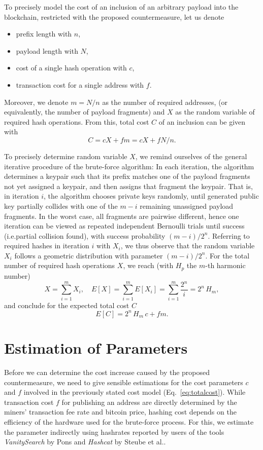 \documentclass[a4paper,11pt,titlepage]{scrbook}
\begin{document}
To precisely model the cost of an inclusion of an arbitrary payload into the blockchain, restricted with the proposed countermeasure, let us denote
\begin{itemize}[noitemsep]
    \item prefix length with $n$,
    \item payload length with $N$,
    \item cost of a single hash operation with $c$,
    \item transaction cost for a single address with $f$.
\end{itemize}
Moreover, we denote $m=N/n$ as the number of required addresses, (or equivalently, the number of payload fragments) and $X$ as the random variable of required hash operations.
From this, total cost $C$ of an inclusion can be given with
\[ C =  c X + fm = c X + fN/n . \]

To precisely determine random variable $X$, we remind ourselves of the general iterative procedure of the brute-force algorithm:
In each iteration, the algorithm determines a keypair such that its prefix matches one of the payload fragments not yet assigned a keypair, and then assigns that fragment the keypair.
That is, in iteration $i$, the algorithm chooses private keys randomly, until generated public key partially collides with one of the $m-i$ remaining unassigned payload fragments.
In the worst case, all fragments are pairwise different, hence one iteration can be viewed as repeated independent Bernoulli trials until success (i.e.\@ partial collision found), with success probability $(m-i)/2^n$.
Referring to required hashes in iteration $i$ with $X_i$, we thus observe that the random variable $X_i$ follows a geometric distribution with parameter $(m-i)/2^n$.
For the total number of required hash operations $X$, we reach (with $H_p$ the $m$-th harmonic number)
\[ X = \sum_{i=1}^{m} X_i, \quad E[X] = \sum_{i=1}^{m} E[X_i] = \sum_{i=1}^{m}\frac{2^n}{i} = 2^n\, H_m, \]
and conclude for the expected total cost $C$
\begin{equation}
    E[C] = 2^n\, H_m\,c + fm.\label{eq:totalcost}
\end{equation}

\section{Estimation of Parameters}\label{sec:parameters}

Before we can determine the cost increase caused by the proposed countermeasure, we need to give sensible estimations for the cost parameters $c$ and $f$ involved in the previously stated cost model (Eq.~\ref{eq:totalcost}).
While transaction cost $f$ for publishing an address are directly determined by the miners' transaction fee rate and bitcoin price, hashing cost depends on the efficiency of the hardware used for the brute-force process.
For this, we estimate the parameter indirectly using hashrates reported by users of the tools \emph{VanitySearch} by Pons \cite{vanitysearch_2019} and \emph{Hashcat} by Steube et al.\@ \cite{hashcat_2020}.
\end{document}

